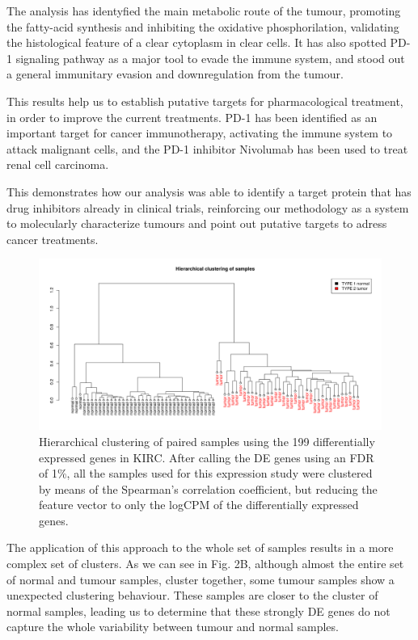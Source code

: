 \documentclass[9pt,twocolumn,twoside]{gsajnl}
\begin{document}
The analysis has identyfied the main metabolic route of the tumour, promoting the fatty-acid synthesis and inhibiting the oxidative phosphorilation, validating the histological feature of a clear cytoplasm in clear cells. It has also spotted PD-1 signaling pathway as a major tool to evade the immune system, and
stood out a general immunitary evasion and downregulation from the tumour.

This results help us to establish putative targets for pharmacological treatment, in order to improve the current treatments. PD-1 has been identified as an important target for cancer immunotherapy, activating the immune system to attack malignant cells, and the PD-1 inhibitor Nivolumab \citep{nivolumab} has been used to treat renal cell carcinoma.


This demonstrates how our analysis was able to identify a target protein that has drug inhibitors already in clinical trials, reinforcing our  methodology as a system to molecularly characterize tumours and point out putative targets to adress cancer treatments.

\begin{figure}[htbp]
\centering
\includegraphics[width=\textwidth]{figures/fig2.png}
\caption{Hierarchical clustering of paired samples using the 199 differentially expressed genes in KIRC. After calling the DE genes using an FDR of 1\%, all the samples used for this expression study were clustered by means of the Spearman's correlation coefficient, but reducing the feature vector to only the logCPM of the differentially expressed genes. }%
\label{fig:spectrum}
\end{figure}

The application of this approach to the whole set of samples results in a more complex set of clusters. As we can see in Fig. 2B, although almost the entire set of normal and tumour samples, cluster together, some tumour samples show a unexpected clustering behaviour. These samples are closer to the cluster of normal samples, leading us to determine that these strongly DE genes do not capture the whole variability between tumour and normal samples.
\end{document}
